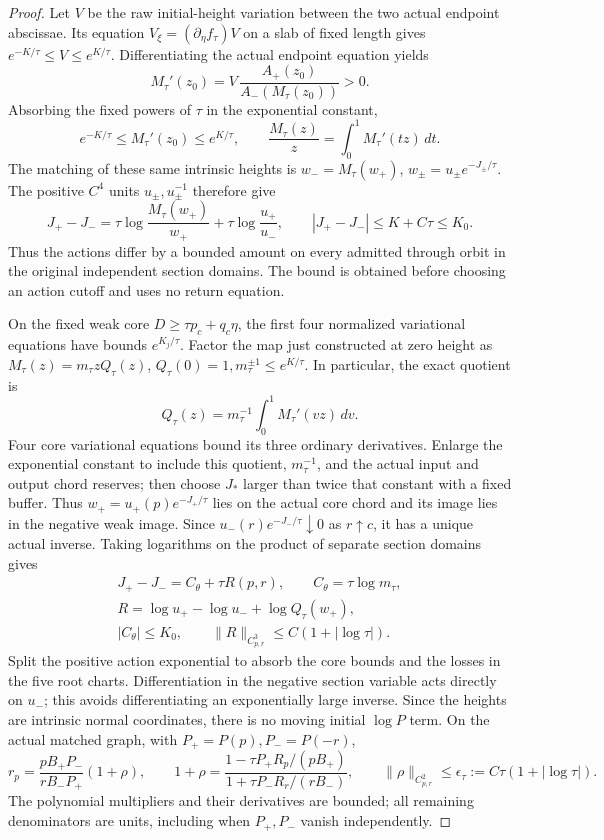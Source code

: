 \begin{proof}
Let \(V\) be the raw initial-height variation between the two actual
endpoint abscissae. Its equation \(V_\xi=(\partial_\eta f_\tau)V\)
on a slab of fixed length gives \(e^{-K/\tau}\le V\le e^{K/\tau}\).
Differentiating the actual endpoint equation yields
\[
 M_\tau'(z_0)=V\,
 \frac{A_+(z_0)}{A_-(M_\tau(z_0))}>0.
\]
Absorbing the fixed powers of \(\tau\) in the exponential constant,
\[
 e^{-K/\tau}\le M_\tau'(z_0)\le e^{K/\tau},\qquad
 \frac{M_\tau(z)}z=\int_0^1M_\tau'(tz)\,dt.
\]
The matching of these same intrinsic heights is
\(w_-=M_\tau(w_+)\), \(w_\pm=u_\pm e^{-J_\pm/\tau}\).
The positive \(C^4\) units \(u_\pm,u_\pm^{-1}\) therefore give
\[
 J_+-J_-
 =\tau\log\frac{M_\tau(w_+)}{w_+}
   +\tau\log\frac{u_+}{u_-},\qquad
 |J_+-J_-|\le K+C\tau\le K_0.
\]
Thus the actions differ by a bounded amount on every admitted through
orbit in the original independent section domains. The bound is obtained
before choosing an action cutoff and uses no return equation.

On the fixed weak core \(D\ge\tau p_c+q_c\eta\), the first four
normalized variational equations have bounds \(e^{K_j/\tau}\).
Factor the map just constructed at zero height as
\(M_\tau(z)=m_\tau zQ_\tau(z)\),
\(Q_\tau(0)=1,m_\tau^{\pm1}\le e^{K/\tau}\).
In particular, the exact quotient is
\[
 Q_\tau(z)=m_\tau^{-1}\int_0^1 M_\tau'(vz)\,dv.
\]
Four core variational equations bound its three ordinary derivatives.
Enlarge the exponential
constant to include this quotient, \(m_\tau^{-1}\), and the actual
input and output chord reserves; then choose \(J_*\) larger than
twice that constant with a fixed buffer. Thus
\(w_+=u_+(p)e^{-J_+/\tau}\) lies on the actual core chord and its
image lies in the negative weak image. Since
\(u_-(r)e^{-J_-/\tau}\downarrow0\) as \(r\uparrow c\), it has a
unique actual inverse. Taking logarithms on the product of separate
section domains gives
\begin{equation}\label{rc:strong-matching}
 \begin{gathered}
 J_+-J_-=C_\theta+\tau R(p,r),\qquad C_\theta=\tau\log m_\tau,\\
 R=\log u_+-\log u_-+\log Q_\tau(w_+),\\
 |C_\theta|\le K_0,\qquad\|R\|_{C^3_{p,r}}\le C(1+|\log\tau|).
 \end{gathered}
\end{equation}
Split the positive action exponential to absorb the core bounds and the
losses in the five root charts. Differentiation in the negative section
variable acts directly on \(u_-\); this avoids differentiating an
exponentially large inverse. Since the heights are intrinsic normal
coordinates, there is no moving initial \(\log P\) term.
On the actual matched graph, with \(P_+=P(p),P_-=P(-r)\),
\begin{equation}\label{rc:strong-variation}
 r_p=\frac{pB_+P_-}{rB_-P_+}(1+\rho),\qquad
 1+\rho=\frac{1-\tau P_+R_p/(pB_+)}{1+\tau P_-R_r/(rB_-)},
 \qquad\|\rho\|_{C^2_{p,r}}\le\epsilon_\tau:=C\tau(1+|\log\tau|).
\end{equation}
The polynomial multipliers and their derivatives are bounded; all
remaining denominators are units, including when \(P_+,P_-\) vanish
independently.


\end{proof}
